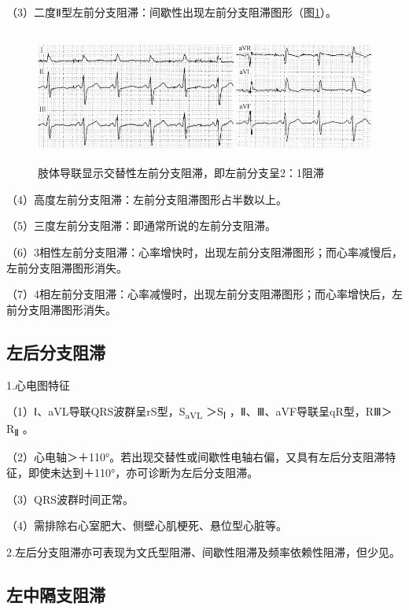 （3）二度Ⅱ型左前分支阻滞：间歇性出现左前分支阻滞图形（图\ref{fig21-8}）。

\begin{figure}[!htbp]
 \centering
 \includegraphics[width=5.58333in,height=1.72917in]{./images/Image00356.jpg}
 \captionsetup{justification=centering}
 \caption{肢体导联显示交替性左前分支阻滞，即左前分支呈2：1阻滞}
 \label{fig21-8}
  \end{figure} 

（4）高度左前分支阻滞：左前分支阻滞图形占半数以上。

（5）三度左前分支阻滞：即通常所说的左前分支阻滞。

（6）3相性左前分支阻滞：心率增快时，出现左前分支阻滞图形；而心率减慢后，左前分支阻滞图形消失。

（7）4相左前分支阻滞：心率减慢时，出现左前分支阻滞图形；而心率增快后，左前分支阻滞图形消失。

\protect\hypertarget{text00028.htmlux5cux23subid347}{}{}

\subsection{左后分支阻滞}

1.心电图特征

（1）Ⅰ、aVL导联QRS波群呈rS型，S\textsubscript{aVL} ＞S\textsubscript{Ⅰ}
，Ⅱ、Ⅲ、aVF导联呈qR型，RⅢ＞R\textsubscript{Ⅱ} 。

（2）心电轴＞＋110°。若出现交替性或间歇性电轴右偏，又具有左后分支阻滞特征，即使未达到＋110°，亦可诊断为左后分支阻滞。

（3）QRS波群时间正常。

（4）需排除右心室肥大、侧壁心肌梗死、悬位型心脏等。

2.左后分支阻滞亦可表现为文氏型阻滞、间歇性阻滞及频率依赖性阻滞，但少见。

\protect\hypertarget{text00028.htmlux5cux23subid348}{}{}

\subsection{左中隔支阻滞}

